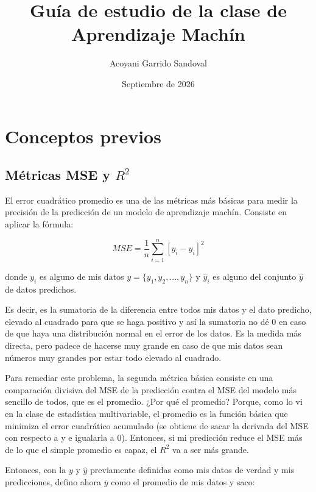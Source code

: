 \documentclass[spanish,oneside]{book} %
\begin{document}
\title {Guía de estudio de la clase de Aprendizaje Machín}
\author {Acoyani Garrido Sandoval}
\date {Septiembre de 2026}
\maketitle

\tableofcontents






\chapter {Conceptos previos}




\section {Métricas MSE y $R^2$}

El error cuadrático promedio es una de las métricas más básicas para medir la precisión de la predicción de un modelo de aprendizaje machín. Consiste en aplicar la fórmula:

\[
   MSE = \frac{1}{n}\sum_{i=1}^{n} [ y_i - \hat{y}_i  ]^2 
\]

donde $y_i$ es alguno de mis datos $y = \{ y_1, y_2, ..., y_n \}$ y $\hat{y}_i$ es alguno del conjunto $\hat{y}$ de datos predichos.

Es decir, es la sumatoria de la diferencia entre todos mis datos y el dato predicho, elevado al cuadrado para que se haga positivo y así la sumatoria no dé 0 en caso de que haya una distribución normal en el error de los datos. Es la medida más directa, pero padece de hacerse muy grande en caso de que mis datos sean números muy grandes por estar todo elevado al cuadrado.

Para remediar este problema, la segunda métrica básica consiste en una comparación divisiva del MSE de la predicción contra el MSE del modelo más sencillo de todos, que es el promedio. ¿Por qué el promedio? Porque, como lo vi en la clase de estadística multivariable, el promedio es la función básica que minimiza el error cuadrático acumulado (se obtiene de sacar la derivada del MSE con respecto a y e igualarla a 0). Entonces, si mi predicción reduce el MSE más de lo que el simple promedio es capaz, el $R^2$ va a ser más grande.

Entonces, con la $y$ y $\hat{y}$ previamente definidas como mis datos de verdad y mis predicciones, defino ahora $\bar{y}$ como el promedio de mis datos y saco:
\end{document}
